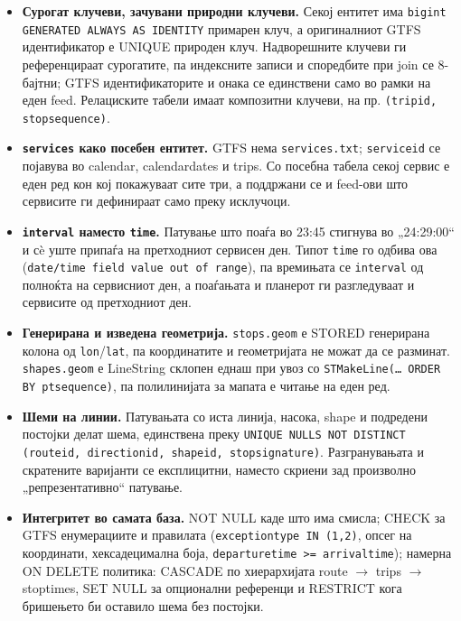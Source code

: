 \documentclass[11pt, a4paper]{article}
\renewcommand{\_}{\oldunderscore\allowbreak}
\newcommand{\code}[1]{\texttt{#1}}
\newcommand{\ra}{$\rightarrow$}
\begin{document}
\begin{itemize}[leftmargin=*]
    \item \textbf{Сурогат клучеви, зачувани природни клучеви.} Секој ентитет има \code{bigint GENERATED ALWAYS AS IDENTITY} примарен клуч, а оригиналниот GTFS идентификатор е UNIQUE природен клуч. Надворешните клучеви ги референцираат сурогатите, па индексните записи и споредбите при join се 8-бајтни; GTFS идентификаторите и онака се единствени само во рамки на еден feed. Релациските табели имаат композитни клучеви, на пр. \code{(trip\_id, stop\_sequence)}.
    \item \textbf{\code{services} како посебен ентитет.} GTFS нема \code{services.txt}; \code{service\_id} се појавува во calendar, calendar\_dates и trips. Со посебна табела секој сервис е еден ред кон кој покажуваат сите три, а поддржани се и feed-ови што сервисите ги дефинираат само преку исклучоци.
    \item \textbf{\code{interval} наместо \code{time}.} Патување што поаѓа во 23:45 стигнува во „24:29:00“ и сè уште припаѓа на претходниот сервисен ден. Типот \code{time} го одбива ова (\code{date/time field value out of range}), па времињата се \code{interval} од полноќта на сервисниот ден, а поаѓањата и планерот ги разгледуваат и сервисите од претходниот ден.
    \item \textbf{Генерирана и изведена геометрија.} \code{stops.geom} е STORED генерирана колона од \code{lon}/\code{lat}, па координатите и геометријата не можат да се разминат. \code{shapes.geom} е LineString склопен еднаш при увоз со \code{ST\_MakeLine(\ldots{} ORDER BY pt\_sequence)}, па полилинијата за мапата е читање на еден ред.
    \item \textbf{Шеми на линии.} Патувањата со иста линија, насока, shape и подредени постојки делат шема, единствена преку \code{UNIQUE NULLS NOT DISTINCT (route\_id, direction\_id, shape\_id, stop\_signature)}. Разгранувањата и скратените варијанти се експлицитни, наместо скриени зад произволно „репрезентативно“ патување.
    \item \textbf{Интегритет во самата база.} NOT NULL каде што има смисла; CHECK за GTFS енумерациите и правилата (\code{exception\_type IN (1,2)}, опсег на координати, хексадецимална боја, \code{departure\_time >= arrival\_time}); намерна ON DELETE политика: CASCADE по хиерархијата route \ra{} trips \ra{} stop\_times, SET NULL за опционални референци и RESTRICT кога бришењето би оставило шема без постојки.
\end{itemize}
\end{document}
